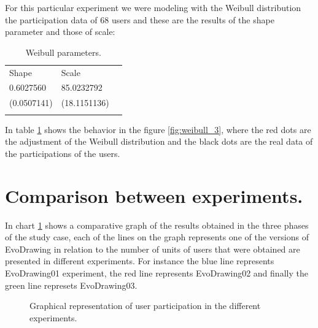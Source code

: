 For this particular experiment we were modeling with the Weibull distribution \cite{weibull1951wide}
the participation data of 68 users and these are the results of the shape parameter
and those of scale:

\begin{table}
\small
\caption{Weibull parameters.}
\label{tab:weibullp_3}
\centering
\small
\begin{tabular}{p{3cm} p{3cm} p{3cm} }
\hline\noalign{\smallskip}
Shape  & Scale &  \\
\noalign{\smallskip}\hline\noalign{\smallskip}
\small{0.6027560} & \small{85.0232792} & \\ \hline
\small{(0.0507141)} & \small{(18.1151136)} & \\ \hline

\noalign{\smallskip}\hline
\end{tabular}
\end{table}

In table \ref{tab:weibullp_3} shows the behavior in the figure
\ref{fig:weibull_3}, where the red dots are the adjustment of the Weibull
distribution and the black dots are the real data of the participations of the
users.



\section{Comparison between experiments.}
In chart \ref{fig:comparison} shows a comparative graph of the results obtained
in the three phases of the study case, each of the lines on the graph represents
one of the versions of EvoDrawing in relation to the number of units of users
that were obtained are presented in different experiments. For instance the blue
line represents EvoDrawing01 experiment, the red line represents EvoDrawing02
and finally the green line represets EvoDrawing03.

\begin{figure}
\centering
{} %
\caption{Graphical representation of user participation in the different experiments.}
\label{fig:comparison}
\end{figure}
